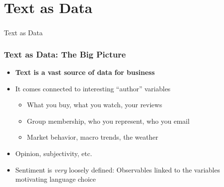 \documentclass[
  shownotes,
  xcolor={svgnames},
  hyperref={colorlinks,citecolor=DarkBlue,linkcolor=DarkRed,urlcolor=DarkBlue}
  , aspectratio=169]{beamer}
\newcommand{\theme}{\color{andesred}}
\begin{document}
\section{Text as Data}
\begin{frame}[fragile]
\frametitle{}


\centering
{\huge \textcolor{andesred}{Text as Data}}


\end{frame}

\begin{frame}[fragile]
\frametitle{Text as Data: The Big Picture}

\begin{itemize}


\item {\bf \theme Text is a vast source of data for business }
\medskip
\item It comes connected to interesting ``author'' variables 
\medskip
  \begin{itemize}
  \item What you buy, what you watch, your reviews
  \medskip
  \item Group membership, who you represent, who you email
  \medskip
  \item Market behavior, macro trends, the weather
  \end{itemize}
\medskip
 
\item Opinion, subjectivity, etc.
\medskip
\item  Sentiment is {\it very} loosely defined:  Observables linked to the variables motivating language choice
\end{itemize}

\end{frame}
\end{document}
